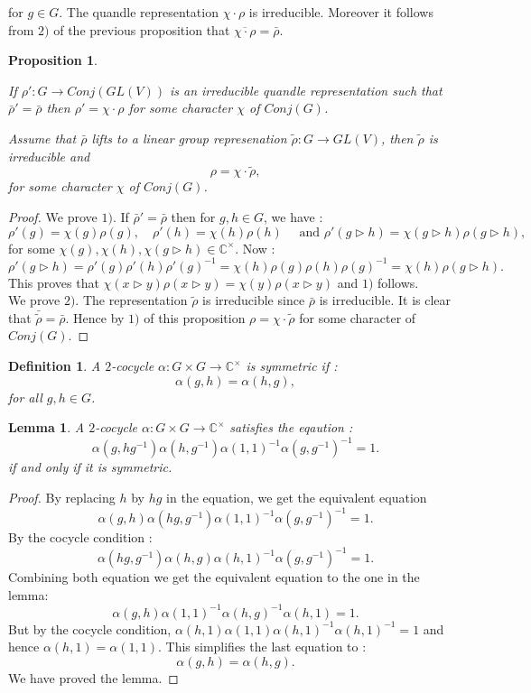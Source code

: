 \documentclass[12pt, reqno]{amsart}
\newtheorem{proposition}[theorem]{Proposition}
\newtheorem{definition}[theorem]{Definition}
\newtheorem{lemma}[theorem]{Lemma}
\begin{document}
for $g \in G$. The quandle representation $\chi \cdot \rho$ is irreducible. Moreover it follows from $2)$ of the previous proposition that $\overline{\chi \cdot \rho}=\bar{\rho}$.
\begin{proposition}\label{pro1}
\item[1)] If $\rho':G\to Conj(GL(V))$ is an irreducible quandle representation such that $\bar{\rho}'=\bar{\rho}$ then $\rho'=\chi \cdot \rho$ for some character $\chi$ of $Conj(G)$.
\item[2)] Assume that $\bar{\rho}$ lifts to a linear group represenation $\tilde{\rho}:G\to GL(V)$, then $\tilde{\rho}$ is irreducible and $$\rho=\chi \cdot \tilde{\rho},$$ for some character $\chi$ of $Conj(G)$.
\end{proposition} 
\begin{proof}
We prove $1)$. If $\bar{\rho}'=\bar{\rho}$ then for $g,h \in G$, we have :
$$ \rho'(g)=\chi(g)\rho(g), \quad \rho'(h)=\chi(h) \rho(h) \quad\text{ and } \rho'(g\triangleright h)=\chi(g\triangleright h) \rho(g\triangleright h),$$
for some $\chi(g),\chi(h),\chi(g\triangleright h)\in \mathbb{C}^\times$. Now :
$$\rho'(g\triangleright h)=\rho'(g)\rho'(h)\rho'(g)^{-1}=\chi(h)\rho(g)\rho(h)\rho(g)^{-1}=\chi(h) \rho(g\triangleright h).$$
This proves that $\chi(x\triangleright y)\rho(x\triangleright y)=\chi(y)\rho(x\triangleright y)$ and $1)$ follows.\\We prove $2)$. The representation $\tilde{\rho}$ is irreducible since $\bar{\rho}$ is irreducible. It is clear that $\bar{\tilde{\rho}}=\bar{\rho}$. Hence by $1)$ of this proposition $\rho=\chi \cdot \tilde{\rho}$ for some character of $Conj(G)$.
\end{proof}
\begin{definition}
A $2$-cocycle $\alpha :G\times G\to \mathbb{C}^\times$ is symmetric if :$$\alpha(g,h)=\alpha(h,g),$$ for all $g,h\in G$.
\end{definition}
\begin{lemma}
A $2$-cocycle $\alpha: G\times G\to \mathbb{C}^\times$ satisfies the eqaution :
$$\alpha(g,hg^{-1})\alpha(h,g^{-1})\alpha(1,1)^{-1}\alpha(g,g^{-1})^{-1}=1.$$
if and only if it is symmetric.
\end{lemma}
\begin{proof}
By replacing $h$ by $hg$ in the equation, we get the equivalent equation
$$\alpha(g,h)\alpha(hg,g^{-1})\alpha(1,1)^{-1}\alpha(g,g^{-1})^{-1}=1.$$
By the cocycle condition : 
$$\alpha(hg,g^{-1}) \alpha(h,g)\alpha(h,1)^{-1}\alpha(g,g^{-1})^{-1}=1.$$
Combining both equation we get the equivalent equation to the one in the lemma:
$$ \alpha(g,h)\alpha(1,1)^{-1}\alpha(h,g)^{-1}\alpha(h,1)=1.$$
But by the cocycle condition, $\alpha(h,1)\alpha(1,1)\alpha(h,1)^{-1}\alpha(h,1)^{-1}=1$ and hence $\alpha(h,1)=\alpha(1,1)$. This simplifies the last equation to :
$$ \alpha(g,h)=\alpha(h,g). $$
We have proved the lemma.
\end{proof}
\end{document}
